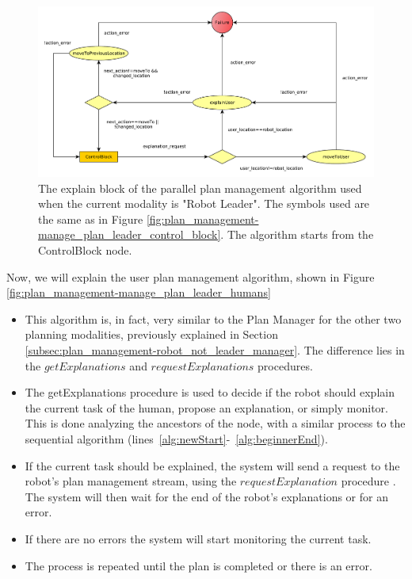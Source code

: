 \begin{figure}[ht!]
 \centering
 \includegraphics[scale=0.5]{img/plan_management/manage_plan_leader_explanation_block.pdf}
 \caption{The explain block of the parallel plan management algorithm used when the current modality is "Robot Leader". The symbols used are the same as in Figure \ref{fig:plan_management-manage_plan_leader_control_block}. The algorithm starts from the ControlBlock node.}
 \label{fig:plan_management-manage_plan_leader_explain_block}
 \end{figure}


Now, we will explain the user plan management algorithm, shown in Figure \ref{fig:plan_management-manage_plan_leader_humans}
\begin{itemize}
\item This algorithm is, in fact, very similar to the Plan Manager for the other two planning modalities, previously explained in Section \ref{subsec:plan_management-robot_not_leader_manager}. The difference lies in the $getExplanations$ and $requestExplanations$ procedures.
\item The getExplanations procedure is used to decide if the robot should explain the current task of the human, propose an explanation, or simply monitor. This is done analyzing the ancestors of the node, with a similar process to the sequential algorithm (lines~\ref{alg:newStart}-~\ref{alg:beginnerEnd}).
\item If the current task should be explained, the system will send a request to the robot's plan management stream, using the $requestExplanation$ procedure . The system will then wait for the end of the robot's explanations or for an error.
\item If there are no errors the system will start monitoring the current task.
\item The process is repeated until the plan is completed or there is an error.
\end{itemize}


